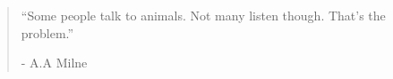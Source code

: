 \documentclass[smalldemyvopaper,11pt,twoside,onecolumn,openright,extrafontsizes]{memoir}
\begin{document}
\clearpage

\vspace*{4.3cm}
\begin{localsize}{10}
  \begin{quote}
    “Some people talk to animals. Not many listen though. That's the problem.”
    \begin{flushright}- A.A Milne \end{flushright}
  \end{quote} 
\end{localsize}
\vspace{1cm}













\end{document}
